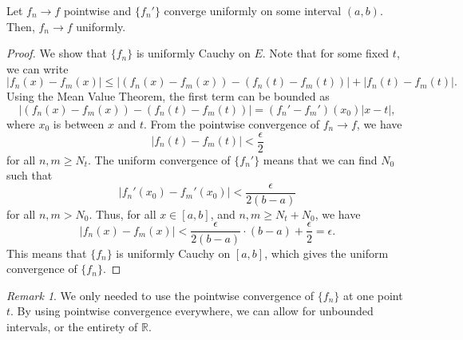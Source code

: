 \documentclass[11pt]{article}
\def\R{\mathbb{R}}
\theoremstyle{definition}
\theoremstyle{remark}
\newtheorem*{remark}{Remark}
\numberwithin{equation}{module}
\begin{document}
    \begin{theorem}
        Let $f_n \to f$ pointwise and $\{f_n'\}$ converge uniformly on some interval
        $(a, b)$. Then, $f_n \to f$ uniformly.
    \end{theorem}
    \begin{proof}
        We show that $\{f_n\}$ is uniformly Cauchy on $E$. Note that for some
        fixed $t$, we can write\[
            |f_n(x) - f_m(x)| \leq |(f_n(x) - f_m(x)) - (f_n(t) - f_m(t))| +
            |f_n(t) - f_m(t)|.
        \] Using the Mean Value Theorem, the first term can be bounded as \[
            |(f_n(x) - f_m(x)) - (f_n(t) - f_m(t))| = (f_n' - f_m')(x_0)|x - t|,
        \] where $x_0$ is between $x$ and $t$.
        From the pointwise convergence of $f_n \to f$, we have \[
            |f_n(t) - f_m(t)| < \frac{\epsilon}{2}
        \] for all $n, m \geq N_t$. The uniform convergence of
        $\{f_n'\}$ means that we can find $N_0$ such that \[
            |f_n'(x_0) - f_m'(x_0)| < \frac{\epsilon}{2(b - a)}
        \] for all $n, m > N_0$. Thus, for all $x \in [a, b]$, and $n, m \geq
        N_t + N_0$, we have \[
            |f_n(x) - f_m(x)| < \frac{\epsilon}{2(b - a)}\cdot (b - a) +
            \frac{\epsilon}{2} = \epsilon.
        \] This means that $\{f_n\}$ is uniformly Cauchy on $[a, b]$, which
        gives the uniform convergence of $\{f_n\}$.
    \end{proof}
    \begin{remark}
        We only needed to use the pointwise convergence of $\{f_n\}$ at one point
        $t$. By using pointwise convergence everywhere, we can allow for unbounded 
        intervals, or the entirety of $\R$.
    \end{remark}
\end{document}
